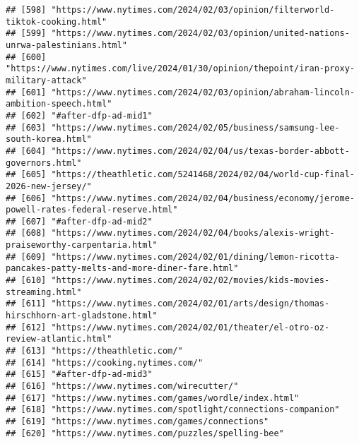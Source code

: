 \documentclass[
]{article}
\begin{document}
\begin{verbatim}
## [598] "https://www.nytimes.com/2024/02/03/opinion/filterworld-tiktok-cooking.html"                                
## [599] "https://www.nytimes.com/2024/02/03/opinion/united-nations-unrwa-palestinians.html"                         
## [600] "https://www.nytimes.com/live/2024/01/30/opinion/thepoint/iran-proxy-military-attack"                       
## [601] "https://www.nytimes.com/2024/02/03/opinion/abraham-lincoln-ambition-speech.html"                           
## [602] "#after-dfp-ad-mid1"                                                                                        
## [603] "https://www.nytimes.com/2024/02/05/business/samsung-lee-south-korea.html"                                  
## [604] "https://www.nytimes.com/2024/02/04/us/texas-border-abbott-governors.html"                                  
## [605] "https://theathletic.com/5241468/2024/02/04/world-cup-final-2026-new-jersey/"                               
## [606] "https://www.nytimes.com/2024/02/04/business/economy/jerome-powell-rates-federal-reserve.html"              
## [607] "#after-dfp-ad-mid2"                                                                                        
## [608] "https://www.nytimes.com/2024/02/04/books/alexis-wright-praiseworthy-carpentaria.html"                      
## [609] "https://www.nytimes.com/2024/02/01/dining/lemon-ricotta-pancakes-patty-melts-and-more-diner-fare.html"     
## [610] "https://www.nytimes.com/2024/02/02/movies/kids-movies-streaming.html"                                      
## [611] "https://www.nytimes.com/2024/02/01/arts/design/thomas-hirschhorn-art-gladstone.html"                       
## [612] "https://www.nytimes.com/2024/02/01/theater/el-otro-oz-review-atlantic.html"                                
## [613] "https://theathletic.com/"                                                                                  
## [614] "https://cooking.nytimes.com/"                                                                              
## [615] "#after-dfp-ad-mid3"                                                                                        
## [616] "https://www.nytimes.com/wirecutter/"                                                                       
## [617] "https://www.nytimes.com/games/wordle/index.html"                                                           
## [618] "https://www.nytimes.com/spotlight/connections-companion"                                                   
## [619] "https://www.nytimes.com/games/connections"                                                                 
## [620] "https://www.nytimes.com/puzzles/spelling-bee"                                                              

\end{verbatim}
\end{document}
